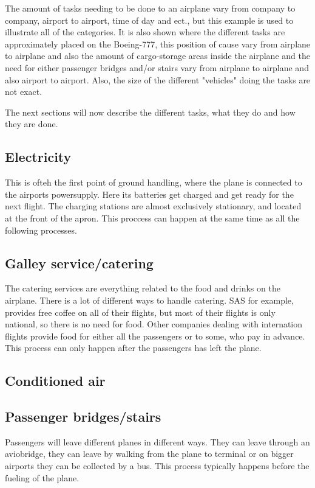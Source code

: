 The amount of tasks needing to be done to an airplane vary from company to company, airport to airport, time of day and ect., but this example is used to illustrate all of the categories. It is also shown where the different tasks are approximately placed on the Boeing-777, this position of cause vary from airplane to airplane and also the amount of cargo-storage areas inside the airplane and the need for either passenger bridges and/or stairs vary from airplane to airplane and also airport to airport. Also, the size of the different "vehicles" doing the tasks are not exact.

The next sections will now describe the different tasks, what they do and how they are done.

\subsection{Electricity}
This is ofteh the first point of ground handling, where the plane is connected to the airports powersupply. Here its batteries get charged and get ready for the next flight. The charging stations are almost exclusively stationary, and located at the front of the apron. This proccess can happen at the same time as all the following processes. 

\subsection{Galley service/catering}
The catering services are everything related to the food and drinks on the airplane. There is a lot of different ways to handle catering. SAS for example, provides free coffee on all of their flights, but most of their flights is only national, so there is no need for food. Other companies dealing with internation flights provide food for either all the passengers or to some, who pay in advance. This process can only happen after the passengers has left the plane.

\subsection{Conditioned air}


\subsection{Passenger bridges/stairs}
Passengers will leave different planes in different ways. They can leave through an aviobridge, they can leave by walking from the plane to terminal or on bigger airports they can be collected by a bus. This process typically happens before the fueling of the plane.

